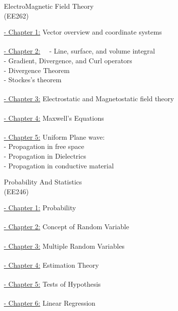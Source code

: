\documentclass[12pt, a4paper]{article}
\begin{document}
\newpage 
\begin{center}
\Huge 
ElectroMagnetic Field Theory \\ (EE262)
\end{center}
\large
\underline{- Chapter 1:} Vector overview and coordinate systems\\ \\
\underline{- Chapter 2:} \ \ - Line, surface, and volume integral \\
\indent \indent \indent \indent \indent - Gradient, Divergence, and Curl  operators \\
\indent \indent \indent \indent \indent - Divergence Theorem \\
\indent \indent \indent \indent \indent - Stockes's theorem  \\ \\
\underline{- Chapter 3:} Electrostatic and Magnetostatic field theory \\ \\
\underline{- Chapter 4:} Maxwell's Equations \\ \\
\underline{- Chapter 5:} Uniform Plane wave: \\
\indent \indent \indent \indent \indent - Propagation in free space  \\ 
\indent \indent \indent \indent \indent - Propagation in Dielectrics \\
\indent \indent \indent \indent \indent - Propagation in conductive material 


\newpage 
\begin{center}
\Huge 
Probability And Statistics \\ (EE246)
\end{center}
\normalsize
\large \underline{- Chapter 1:} Probability\\ \\
\large \underline{- Chapter 2:} Concept of Random Variable\\ \\
\large \underline{- Chapter 3:} Multiple Random Variables\\ \\
\large \underline{- Chapter 4:} Estimation Theory\\ \\
\large \underline{- Chapter 5:} Tests of Hypothesis\\ \\
\large \underline{- Chapter 6:} Linear Regression\\ \\
    
\end{document}
